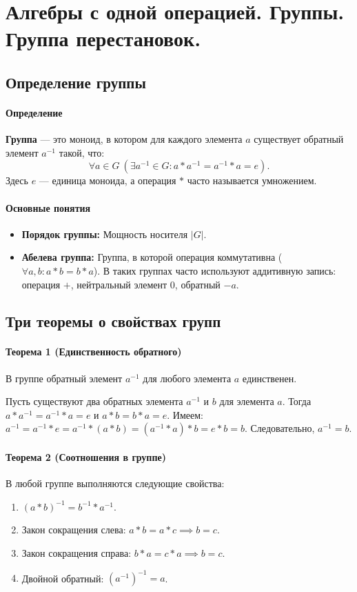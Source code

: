 \section{Алгебры с одной операцией. Группы. Группа перестановок.}

\subsection*{Определение группы}

\paragraph{Определение}
\textbf{Группа} — это моноид, в котором для каждого элемента $a$ существует обратный элемент $a^{-1}$ такой, что:
$$\forall a \in G \ (\exists a^{-1} \in G: a \ast a^{-1} = a^{-1} \ast a = e).$$
Здесь $e$ — единица моноида, а операция $\ast$ часто называется умножением.

\paragraph{Основные понятия}
\begin{itemize}
    \item \textbf{Порядок группы:} Мощность носителя $|G|$.
    \item \textbf{Абелева группа:} Группа, в которой операция коммутативна ($\forall a, b: a \ast b = b \ast a$). В таких группах часто используют аддитивную запись: операция $+$, нейтральный элемент $0$, обратный $-a$.
\end{itemize}

\subsection*{Три теоремы о свойствах групп}

\paragraph{Теорема 1 (Единственность обратного)}
В группе обратный элемент $a^{-1}$ для любого элемента $a$ единственен.

Пусть существуют два обратных элемента $a^{-1}$ и $b$ для элемента $a$. Тогда $a \ast a^{-1} = a^{-1} \ast a = e$ и $a \ast b = b \ast a = e$.
Имеем: $a^{-1} = a^{-1} \ast e = a^{-1} \ast (a \ast b) = (a^{-1} \ast a) \ast b = e \ast b = b$. Следовательно, $a^{-1} = b$.

\paragraph{Теорема 2 (Соотношения в группе)}
В любой группе выполняются следующие свойства:
\begin{enumerate}
    \item $(a \ast b)^{-1} = b^{-1} \ast a^{-1}$.
    \item Закон сокращения слева: $a \ast b = a \ast c \implies b = c$.
    \item Закон сокращения справа: $b \ast a = c \ast a \implies b = c$.
    \item Двойной обратный: $(a^{-1})^{-1} = a$.
\end{enumerate}

